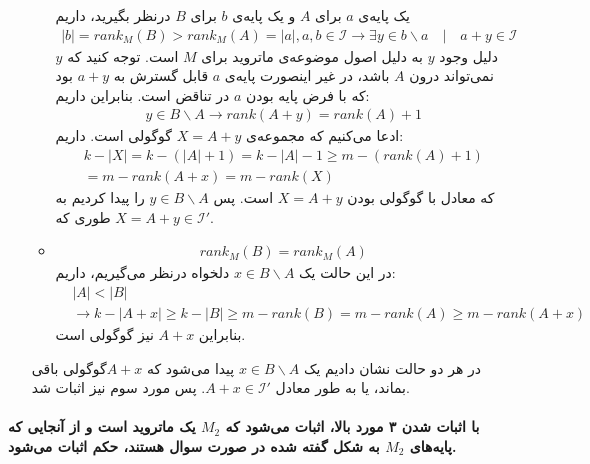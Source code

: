 \documentclass[a4paper,12pt]{article}
\begin{document}
\begin{enumerate}
\begin{itemize}
یک پایه‌ی $a$ برای $A$ و یک پایه‌ی $b$ برای $B$ درنظر بگیرید، داریم
\begin{align*}
|b| = rank_M(B) > rank_M(A) = |a| , a , b \in \mathcal{I} \rightarrow \exists y \in b\backslash a \quad | \quad a + y \in \mathcal{I}
\end{align*}
دلیل وجود $y$ به دلیل اصول موضوعه‌ی ماتروید برای  $M$ است. توجه کنید که $y$ نمی‌تواند درون $A$ باشد، در غیر اینصورت پایه‌ی $a$ قابل گسترش به $a + y$ بود که با فرض پایه بودن $a$ در تناقض است. بنابراین  داریم:
\begin{align*}
	y \in B \backslash A \rightarrow rank(A + y) = rank(A) + 1
\end{align*}
ادعا می‌کنیم که مجموعه‌ی
$X = A + y$
گوگولی است. داریم:
\begin{align*}
	k - |X| = k - (|A| + 1) = k - |A| - 1 \geq m - (rank(A) + 1) \\ = m - rank(A + x) = m - rank(X)
\end{align*}
که معادل با گوگولی بودن $X = A + y$ است. پس 
$y \in B \backslash A$
را پیدا کردیم به طوری که
$X = A + y \in \mathcal{I'}$.
\item 
\begin{align*}
	rank_M(B) = rank_M(A)
\end{align*}
در این حالت یک
$x \in B \backslash A$
دلخواه درنظر می‌گیریم، داریم:
\begin{align*}
	&|A| < |B| \\
	&\rightarrow k - |A + x| \geq k - |B| \geq m - rank(B) = m - rank(A) \geq m - rank(A + x)
\end{align*}
بنابراین 
$A + x$
نیز گوگولی است.
\end{itemize}
در هر دو حالت نشان دادیم یک $x \in B \backslash A$ پیدا می‌شود که $A + x$گوگولی باقی بماند، یا به طور معادل
$A + x \in \mathcal{I'}$.
پس مورد سوم نیز اثبات شد. 
\end{enumerate}
\paragraph{\color{blue}
با اثبات شدن ۳ مورد بالا، اثبات می‌شود که $M_2$ یک ماتروید است و از آنجایی که پایه‌های $M_2$ به شکل گفته شده در صورت سوال هستند، حکم اثبات می‌شود.
}
\end{document}
